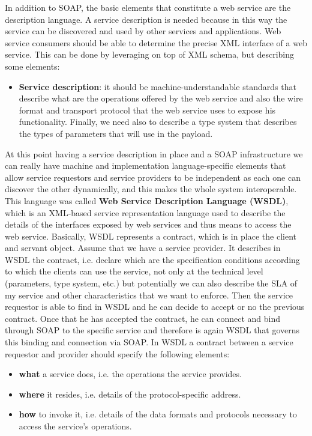 In addition to SOAP, the basic elements that constitute a web service are the description language.
A service description is needed because in this way the service can be discovered and used by other services and applications.
Web service consumers should be able to determine the precise XML interface of a web service. This can be done by leveraging on top of XML schema, but describing some elements:
\begin{itemize}
    \item \textbf{Service description}: it should be machine-understandable standards that describe what are the operations offered by the web service and also the wire format and transport protocol that the web service uses to expose his functionality. Finally, we need also to describe a type system that describes the types of parameters that will use in the payload.
\end{itemize}
At this point having a service description in place and a SOAP infrastructure we can really have machine and implementation language-specific elements that allow service requestors and service providers to be independent as each one can discover the other dynamically, and this makes the whole system interoperable.
This language was called \textbf{Web Service Description Language (WSDL)}, which is an XML-based service representation language used to describe the details of the interfaces exposed by web services and thus means to access the web service.
Basically, WSDL represents a contract, which is in place the client and servant object.
Assume that we have a service provider.
It describes in WSDL the contract, i.e. declare which are the specification conditions according to which the clients can use the service, not only at the technical level (parameters, type system, etc.) but potentially we can also describe the SLA of my service and other characteristics that we want to enforce.
Then the service requestor is able to find in WSDL and he can decide to accept or no the previous contract.
Once that he has accepted the contract, he can connect and bind through SOAP to the specific service and therefore is again WSDL that governs this binding and connection via SOAP.
In WSDL a contract between a service requestor and provider should specify the following elements:
\begin{itemize}
    \item \textbf{what} a service does, i.e. the operations the service provides.
    \item \textbf{where} it resides, i.e. details of the protocol-specific address.
    \item \textbf{how} to invoke it, i.e. details of the data formats and protocols necessary to access the service's operations.
\end{itemize}
